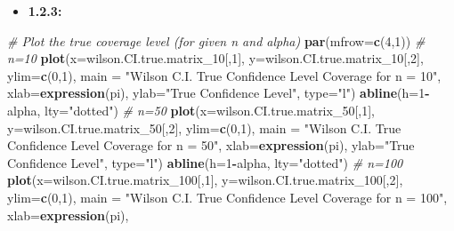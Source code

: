\documentclass[]{article}
\newenvironment{Shaded}{\begin{snugshade}}{\end{snugshade}}
\newcommand{\CommentTok}[1]{\textcolor[rgb]{0.56,0.35,0.01}{\textit{#1}}}
\newcommand{\DataTypeTok}[1]{\textcolor[rgb]{0.13,0.29,0.53}{#1}}
\newcommand{\DecValTok}[1]{\textcolor[rgb]{0.00,0.00,0.81}{#1}}
\newcommand{\KeywordTok}[1]{\textcolor[rgb]{0.13,0.29,0.53}{\textbf{#1}}}
\newcommand{\NormalTok}[1]{#1}
\newcommand{\OperatorTok}[1]{\textcolor[rgb]{0.81,0.36,0.00}{\textbf{#1}}}
\newcommand{\StringTok}[1]{\textcolor[rgb]{0.31,0.60,0.02}{#1}}
\providecommand{\tightlist}{%
  \setlength{\itemsep}{0pt}\setlength{\parskip}{0pt}}
\begin{document}
\begin{itemize}
\tightlist
\item
  \textbf{1.2.3:}
\end{itemize}

\begin{Shaded}
\begin{Highlighting}[]
\CommentTok{# Plot the true coverage level (for given n and alpha)}
\KeywordTok{par}\NormalTok{(}\DataTypeTok{mfrow=}\KeywordTok{c}\NormalTok{(}\DecValTok{4}\NormalTok{,}\DecValTok{1}\NormalTok{))}
\CommentTok{# n=10}
\KeywordTok{plot}\NormalTok{(}\DataTypeTok{x=}\NormalTok{wilson.CI.true.matrix_}\DecValTok{10}\NormalTok{[,}\DecValTok{1}\NormalTok{],}
     \DataTypeTok{y=}\NormalTok{wilson.CI.true.matrix_}\DecValTok{10}\NormalTok{[,}\DecValTok{2}\NormalTok{],}
     \DataTypeTok{ylim=}\KeywordTok{c}\NormalTok{(}\DecValTok{0}\NormalTok{,}\DecValTok{1}\NormalTok{),}
     \DataTypeTok{main =} \StringTok{"Wilson C.I. True Confidence Level Coverage for n = 10"}\NormalTok{, }\DataTypeTok{xlab=}\KeywordTok{expression}\NormalTok{(pi),}
     \DataTypeTok{ylab=}\StringTok{"True Confidence Level"}\NormalTok{,}
     \DataTypeTok{type=}\StringTok{"l"}\NormalTok{)}
\KeywordTok{abline}\NormalTok{(}\DataTypeTok{h=}\DecValTok{1}\OperatorTok{-}\NormalTok{alpha, }\DataTypeTok{lty=}\StringTok{"dotted"}\NormalTok{)}
\CommentTok{# n=50}
\KeywordTok{plot}\NormalTok{(}\DataTypeTok{x=}\NormalTok{wilson.CI.true.matrix_}\DecValTok{50}\NormalTok{[,}\DecValTok{1}\NormalTok{],}
     \DataTypeTok{y=}\NormalTok{wilson.CI.true.matrix_}\DecValTok{50}\NormalTok{[,}\DecValTok{2}\NormalTok{],}
     \DataTypeTok{ylim=}\KeywordTok{c}\NormalTok{(}\DecValTok{0}\NormalTok{,}\DecValTok{1}\NormalTok{),}
     \DataTypeTok{main =} \StringTok{"Wilson C.I. True Confidence Level Coverage for n = 50"}\NormalTok{, }\DataTypeTok{xlab=}\KeywordTok{expression}\NormalTok{(pi),}
     \DataTypeTok{ylab=}\StringTok{"True Confidence Level"}\NormalTok{,}
     \DataTypeTok{type=}\StringTok{"l"}\NormalTok{)}
\KeywordTok{abline}\NormalTok{(}\DataTypeTok{h=}\DecValTok{1}\OperatorTok{-}\NormalTok{alpha, }\DataTypeTok{lty=}\StringTok{"dotted"}\NormalTok{)}
\CommentTok{# n=100}
\KeywordTok{plot}\NormalTok{(}\DataTypeTok{x=}\NormalTok{wilson.CI.true.matrix_}\DecValTok{100}\NormalTok{[,}\DecValTok{1}\NormalTok{],}
     \DataTypeTok{y=}\NormalTok{wilson.CI.true.matrix_}\DecValTok{100}\NormalTok{[,}\DecValTok{2}\NormalTok{],}
     \DataTypeTok{ylim=}\KeywordTok{c}\NormalTok{(}\DecValTok{0}\NormalTok{,}\DecValTok{1}\NormalTok{),}
     \DataTypeTok{main =} \StringTok{"Wilson C.I. True Confidence Level Coverage for n = 100"}\NormalTok{, }\DataTypeTok{xlab=}\KeywordTok{expression}\NormalTok{(pi),}

\end{Highlighting}
\end{Shaded}
\end{document}
